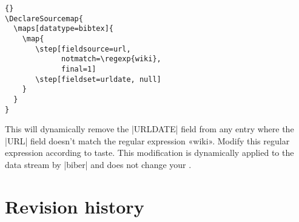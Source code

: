 \documentclass{ltxdockit}
\begin{document}
\begin{lstlisting}[style=latex]{}
\DeclareSourcemap{
  \maps[datatype=bibtex]{
    \map{
       \step[fieldsource=url,
             notmatch=\regexp{wiki},
             final=1]
       \step[fieldset=urldate, null]
    }
  }
}
\end{lstlisting}

\noindent This will dynamically remove the |URLDATE| field from any entry
where the |URL| field doesn't match the regular expression «wiki». Modify this
regular expression according to taste. This modification is dynamically
applied to the data stream by |biber| and does not change your .

\section{Revision history}\label{rev}
\end{document}
